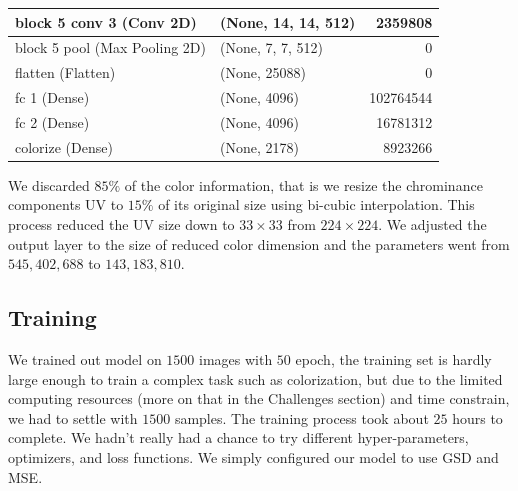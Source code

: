 \documentclass[12pt]{article}
\begin{document}
\begin{table}[H]
\begin{tabular}{|l|l|r|}
		block 5 conv 3 (Conv 2D)      &  (None, 14, 14, 512)    &    2359808     \\ \hline 
		block 5 pool (Max Pooling 2D) &  (None, 7, 7, 512)      &    0           \\ \hline 
		flatten (Flatten)             &  (None, 25088)          &    0           \\ \hline 
		fc 1 (Dense)                  &  (None, 4096)           &    102764544   \\ \hline 
		fc 2 (Dense)                  &  (None, 4096)           &    16781312    \\ \hline 
		colorize (Dense)              & (None, 2178)            &    8923266     \\ \hline 
	\end{tabular}
\end{table}


We discarded $85\%$ of the color information, that is we resize the chrominance components UV to $15\%$ of its original size using bi-cubic interpolation. This process reduced the UV size down to $33\times33$ from $224\times224$. We adjusted the output layer to the size of reduced color dimension and the parameters went from $545,402,688$ to $143,183,810$. 


\subsection{Training}
We trained out model on $1500$ images with $50$ epoch, the training set is hardly large enough to train a complex task such as colorization, but due to the limited computing resources (more on that in the Challenges section) and time constrain, we had to settle with $1500$ samples. The training process took about $25$ hours to complete. We hadn't really had a chance to try different hyper-parameters, optimizers, and loss functions. We simply configured our model to use GSD and MSE. 
\end{document}
